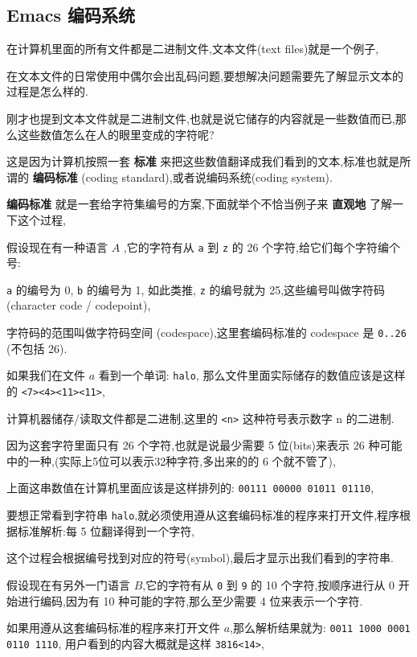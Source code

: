 \documentclass[11pt]{article}
\begin{document}
\subsection{Emacs 编码系统}
\label{sec:org580f980}

在计算机里面的所有文件都是二进制文件,文本文件(text files)就是一个例子,

在文本文件的日常使用中偶尔会出乱码问题,要想解决问题需要先了解显示文本的过程是怎么样的.

刚才也提到文本文件就是二进制文件,也就是说它储存的内容就是一些数值而已,那么这些数值怎么在人的眼里变成的字符呢?

这是因为计算机按照一套 \textbf{标准} 来把这些数值翻译成我们看到的文本,标准也就是所谓的 \textbf{编码标准} (coding standard),或者说编码系统(coding system).

\textbf{编码标准} 就是一套给字符集编号的方案,下面就举个不恰当例子来 \textbf{直观地} 了解一下这个过程,

假设现在有一种语言 \(A\) ,它的字符有从 \texttt{a} 到 \texttt{z} 的 26 个字符,给它们每个字符编个号:

\texttt{a} 的编号为 0, \texttt{b} 的编号为 1, 如此类推, \texttt{z} 的编号就为 25,这些编号叫做字符码(character code / codepoint),

字符码的范围叫做字符码空间 (codespace),这里套编码标准的 codespace 是 \texttt{0..26} (不包括 26).

如果我们在文件 \(a\) 看到一个单词: \texttt{halo}, 那么文件里面实际储存的数值应该是这样的 \texttt{<7><4><11><11>},

计算机器储存/读取文件都是二进制,这里的 \texttt{<n>} 这种符号表示数字 n 的二进制.

因为这套字符里面只有 26 个字符,也就是说最少需要 5 位(bits)来表示 26 种可能中的一种,(实际上5位可以表示32种字符,多出来的的 6 个就不管了),

上面这串数值在计算机里面应该是这样排列的: \texttt{00111 00000 01011 01110},

要想正常看到字符串 \texttt{halo},就必须使用遵从这套编码标准的程序来打开文件,程序根据标准解析:每 5 位翻译得到一个字符,

这个过程会根据编号找到对应的符号(symbol),最后才显示出我们看到的字符串.

假设现在有另外一门语言 \(B\),它的字符有从 \texttt{0} 到 \texttt{9} 的 10 个字符,按顺序进行从 0 开始进行编码,因为有 10 种可能的字符,那么至少需要 4 位来表示一个字符.

如果用遵从这套编码标准的程序来打开文件 \(a\),那么解析结果就为: \texttt{0011 1000 0001 0110 1110}, 用户看到的内容大概就是这样 \texttt{3816<14>},
\end{document}
